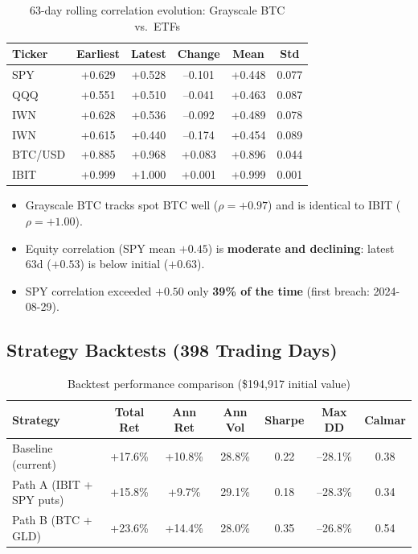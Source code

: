 \documentclass[11pt,letterpaper]{article}
\begin{document}
\begin{table}[H]
\centering
\caption{63-day rolling correlation evolution: Grayscale BTC vs.\ ETFs}
\begin{tabular}{lccccc}
\toprule
Ticker & Earliest & Latest & Change & Mean & Std \\
\midrule
SPY      & +0.629 & +0.528 & --0.101 & +0.448 & 0.077 \\
QQQ      & +0.551 & +0.510 & --0.041 & +0.463 & 0.087 \\
IWN      & +0.628 & +0.536 & --0.092 & +0.489 & 0.078 \\
IWN      & +0.615 & +0.440 & --0.174 & +0.454 & 0.089 \\
BTC/USD  & +0.885 & +0.968 & +0.083  & +0.896 & 0.044 \\
IBIT     & +0.999 & +1.000 & +0.001  & +0.999 & 0.001 \\
\bottomrule
\end{tabular}
\end{table}

\begin{itemize}[nosep]
  \item Grayscale BTC tracks spot BTC well ($\rho = +0.97$) and is
        identical to IBIT ($\rho = +1.00$).
  \item Equity correlation (SPY mean $+0.45$) is \textbf{moderate and
        declining}: latest 63d ($+0.53$) is below initial ($+0.63$).
  \item SPY correlation exceeded $+0.50$ only \textbf{39\% of the time}
        (first breach: 2024-08-29).
\end{itemize}

\subsection{Strategy Backtests (398 Trading Days)}

\begin{table}[H]
\centering
\caption{Backtest performance comparison (\$194,917 initial value)}
\begin{tabular}{lcccccc}
\toprule
Strategy & Total Ret & Ann Ret & Ann Vol & Sharpe & Max DD & Calmar \\
\midrule
Baseline (current)          & +17.6\% & +10.8\% & 28.8\% & 0.22 & --28.1\% & 0.38 \\
Path A (IBIT + SPY puts)    & +15.8\% &  +9.7\% & 29.1\% & 0.18 & --28.3\% & 0.34 \\
Path B (BTC + GLD)          & +23.6\% & +14.4\% & 28.0\% & 0.35 & --26.8\% & 0.54 \\
\bottomrule
\end{tabular}
\end{table}
\end{document}
